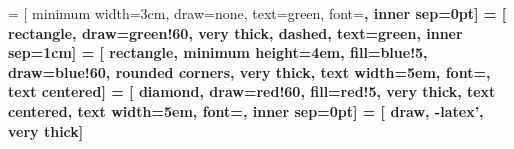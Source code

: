  = [
    minimum width=3cm,
    draw=none,
    text=green,
    font=\bf,
    inner sep=0pt]
 = [
    rectangle,
    draw=green!60,
    very thick,
    dashed,
    text=green,
    inner sep=1cm]
 = [
    rectangle,
    minimum height=4em,
    fill=blue!5,
    draw=blue!60,
    rounded corners,
    very thick,
    text width=5em,
    font=\bf,
    text centered]
 = [
    diamond,
    draw=red!60,
    fill=red!5,
    very thick,
    text centered,
    text width=5em,
    font=\bf,
    inner sep=0pt]
 = [
    draw,
    -latex',
    very thick]
